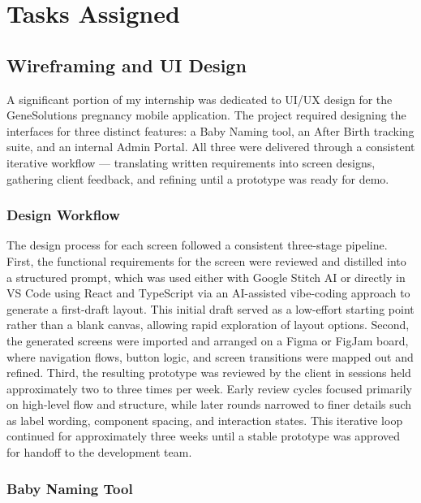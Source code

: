 \chapter{Tasks Assigned}
\label{chap:tasks}


\section{Wireframing and UI Design}

A significant portion of my internship was dedicated to UI/UX design for the GeneSolutions pregnancy mobile application. The project required designing the interfaces for three distinct features: a Baby Naming tool, an After Birth tracking suite, and an internal Admin Portal. All three were delivered through a consistent iterative workflow — translating written requirements into screen designs, gathering client feedback, and refining until a prototype was ready for demo.

\subsection{Design Workflow}

The design process for each screen followed a consistent three-stage pipeline. First, the functional requirements for the screen were reviewed and distilled into a structured prompt, which was used either with Google Stitch AI or directly in VS Code using React and TypeScript via an AI-assisted vibe-coding approach to generate a first-draft layout. This initial draft served as a low-effort starting point rather than a blank canvas, allowing rapid exploration of layout options. Second, the generated screens were imported and arranged on a Figma or FigJam board, where navigation flows, button logic, and screen transitions were mapped out and refined. Third, the resulting prototype was reviewed by the client in sessions held approximately two to three times per week. Early review cycles focused primarily on high-level flow and structure, while later rounds narrowed to finer details such as label wording, component spacing, and interaction states. This iterative loop continued for approximately three weeks until a stable prototype was approved for handoff to the development team.

\subsection{Baby Naming Tool}


